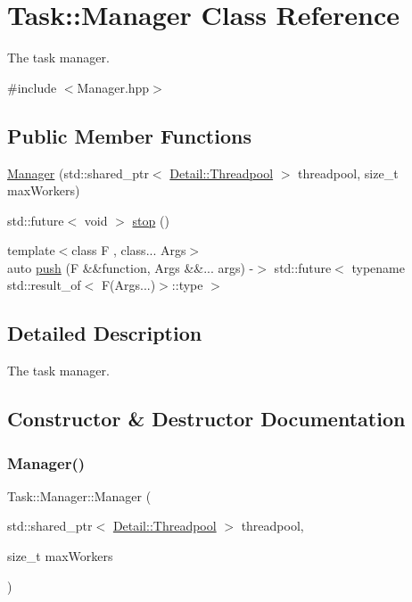 \hypertarget{classTask_1_1Manager}{}\section{Task\+:\+:Manager Class Reference}
\label{classTask_1_1Manager}


The task manager.  




{\ttfamily \#include $<$Manager.\+hpp$>$}

\subsection*{Public Member Functions}
\begin{DoxyCompactItemize}
\item 
\hyperlink{classTask_1_1Manager_a8b898d35918fd236dda424988b78d549}{Manager} (std\+::shared\+\_\+ptr$<$ \hyperlink{classTask_1_1Detail_1_1Threadpool}{Detail\+::\+Threadpool} $>$ threadpool, size\+\_\+t max\+Workers)
\item 
std\+::future$<$ void $>$ \hyperlink{classTask_1_1Manager_adc748804a61954b13a3baab6c81331f3}{stop} ()
\item 
{\footnotesize template$<$class F , class... Args$>$ }\\auto \hyperlink{classTask_1_1Manager_a07c1fcc7d584edfab6407df34bcef8f9}{push} (F \&\&function, Args \&\&... args) -\/$>$ std\+::future$<$ typename std\+::result\+\_\+of$<$ F(Args...)$>$\+::type $>$
\end{DoxyCompactItemize}


\subsection{Detailed Description}
The task manager. 

\subsection{Constructor \& Destructor Documentation}
\mbox{\label{classTask_1_1Manager_a8b898d35918fd236dda424988b78d549}} 
\subsubsection{\texorpdfstring{Manager()}{Manager()}}
{\footnotesize\ttfamily Task\+::\+Manager\+::\+Manager (\begin{DoxyParamCaption}\item[{std\+::shared\+\_\+ptr$<$ \hyperlink{classTask_1_1Detail_1_1Threadpool}{Detail\+::\+Threadpool} $>$}]{threadpool,  }\item[{size\+\_\+t}]{max\+Workers }\end{DoxyParamCaption})}

